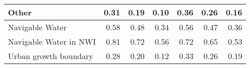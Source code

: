 \begin{tabular}{lrrrrrr}
\quad Other & 0.31 & 0.19 & 0.10 & 0.36 & 0.26 & 0.16 \\
\midrule
Navigable Water & 0.58 & 0.48 & 0.34 & 0.56 & 0.47 & 0.36 \\
Navigable Water in NWI & 0.81 & 0.72 & 0.56 & 0.72 & 0.65 & 0.53 \\
\midrule 
Urban growth boundary & 0.28 & 0.20 & 0.12 & 0.33 & 0.26 & 0.19 \\
\end{tabular}
